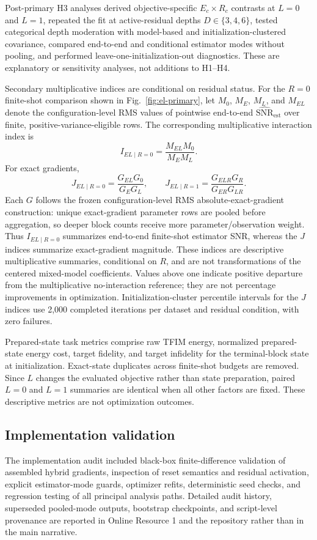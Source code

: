 \documentclass[pdflatex,sn-mathphys-num,Numbered]{sn-jnl}
\newcommand{\snrest}{\widehat{\mathrm{SNR}}_{\mathrm{est}}}
\begin{document}
Post-primary H3 analyses derived objective-specific $E_c\times R_c$ contrasts at $L=0$ and $L=1$, repeated the fit at active-residual depths $D\in\{3,4,6\}$, tested categorical depth moderation with model-based and initialization-clustered covariance, compared end-to-end and conditional estimator modes without pooling, and performed leave-one-initialization-out diagnostics. These are explanatory or sensitivity analyses, not additions to H1--H4.

Secondary multiplicative indices are conditional on residual status. For the $R=0$ finite-shot comparison shown in Fig.~\ref{fig:el-primary}, let $M_0$, $M_E$, $M_L$, and $M_{EL}$ denote the configuration-level RMS values of pointwise end-to-end $\snrest$ over finite, positive-variance-eligible rows. The corresponding multiplicative interaction index is
\[
I_{EL\mid R=0}
=\frac{M_{EL}M_0}{M_EM_L}.
\]
For exact gradients,
\[
J_{EL\mid R=0}
=\frac{G_{EL}G_0}{G_EG_L},\qquad
J_{EL\mid R=1}
=\frac{G_{ELR}G_R}{G_{ER}G_{LR}}.
\]
Each $G$ follows the frozen configuration-level RMS absolute-exact-gradient construction: unique exact-gradient parameter rows are pooled before aggregation, so deeper block counts receive more parameter/observation weight. Thus $I_{EL\mid R=0}$ summarizes end-to-end finite-shot estimator SNR, whereas the $J$ indices summarize exact-gradient magnitude. These indices are descriptive multiplicative summaries, conditional on $R$, and are not transformations of the centered mixed-model coefficients. Values above one indicate positive departure from the multiplicative no-interaction reference; they are not percentage improvements in optimization. Initialization-cluster percentile intervals for the $J$ indices use 2,000 completed iterations per dataset and residual condition, with zero failures.

Prepared-state task metrics comprise raw TFIM energy, normalized prepared-state energy cost, target fidelity, and target infidelity for the terminal-block state at initialization. Exact-state duplicates across finite-shot budgets are removed. Since $L$ changes the evaluated objective rather than state preparation, paired $L=0$ and $L=1$ summaries are identical when all other factors are fixed. These descriptive metrics are not optimization outcomes.

\subsection{Implementation validation}

The implementation audit included black-box finite-difference validation of assembled hybrid gradients, inspection of reset semantics and residual activation, explicit estimator-mode guards, optimizer refits, deterministic seed checks, and regression testing of all principal analysis paths. Detailed audit history, superseded pooled-mode outputs, bootstrap checkpoints, and script-level provenance are reported in Online Resource 1 and the repository rather than in the main narrative.
\end{document}
